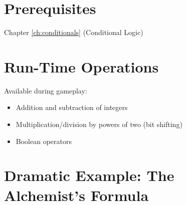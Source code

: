 \documentclass[11pt,letterpaper,oldstylefigures]{memoir}
\begin{document}
\section{Prerequisites}
Chapter \ref{ch:conditionals} (Conditional Logic)

\section{Run-Time Operations}

Available during gameplay:
\begin{itemize}
\item Addition and subtraction of integers
\item Multiplication/division by powers of two (bit shifting)
\item Boolean \gls{operator}s
\end{itemize}

\section{Dramatic Example: The Alchemist's Formula}
\end{document}
